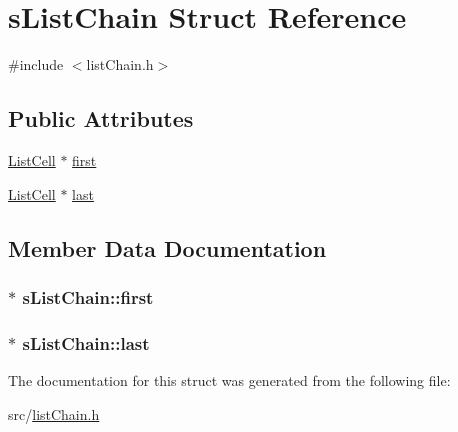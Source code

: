 \hypertarget{structs_list_chain}{\section{s\+List\+Chain Struct Reference}
\label{structs_list_chain}
}


{\ttfamily \#include $<$list\+Chain.\+h$>$}

\subsection*{Public Attributes}
\begin{DoxyCompactItemize}
\item 
\hyperlink{list_chain_8h_aaa3ebfecddc096d51b6e8a14a231193a}{List\+Cell} $\ast$ \hyperlink{structs_list_chain_aa74e2c7afb70293fc684d20e707d7fa0}{first}
\item 
\hyperlink{list_chain_8h_aaa3ebfecddc096d51b6e8a14a231193a}{List\+Cell} $\ast$ \hyperlink{structs_list_chain_ab09f71ead53537d836bfc80f25f328e1}{last}
\end{DoxyCompactItemize}


\subsection{Member Data Documentation}
\hypertarget{structs_list_chain_aa74e2c7afb70293fc684d20e707d7fa0}{
\subsubsection[{first}]{$\ast$ s\+List\+Chain\+::first}}\label{structs_list_chain_aa74e2c7afb70293fc684d20e707d7fa0}
\hypertarget{structs_list_chain_ab09f71ead53537d836bfc80f25f328e1}{
\subsubsection[{last}]{$\ast$ s\+List\+Chain\+::last}}\label{structs_list_chain_ab09f71ead53537d836bfc80f25f328e1}


The documentation for this struct was generated from the following file\+:\begin{DoxyCompactItemize}
\item 
src/\hyperlink{list_chain_8h}{list\+Chain.\+h}\end{DoxyCompactItemize}
